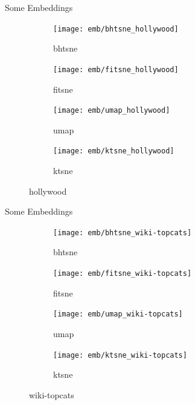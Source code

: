 \documentclass{beamer}
\begin{document}
\begin{frame}[fragile]{Some Embeddings}
    \vspace{-.5em}
    \begin{figure}[h]
        \centering
        \begin{subfigure}{0.3\textwidth}
            \texttt{[image: emb/bhtsne\_hollywood]}
            \caption{bhtsne}
            \vspace{-2em}
        \end{subfigure}
        \begin{subfigure}{0.3\textwidth}
            \texttt{[image: emb/fitsne\_hollywood]}
            \caption{fitsne}
            \vspace{-2em}
        \end{subfigure}
        \par\bigskip
        \begin{subfigure}{0.3\textwidth}
            \texttt{[image: emb/umap\_hollywood]}
            \caption{umap}
            \vspace{-1em}
        \end{subfigure}
        \begin{subfigure}{0.3\textwidth}
            \texttt{[image: emb/ktsne\_hollywood]}
            \caption{ktsne}
            \vspace{-1em}
        \end{subfigure}
        \caption{hollywood}
    \end{figure}
\end{frame}

\begin{frame}[fragile]{Some Embeddings}
    \vspace{-.5em}
    \begin{figure}[h]
        \centering
        \begin{subfigure}{0.3\textwidth}
            \texttt{[image: emb/bhtsne\_wiki-topcats]}
            \caption{bhtsne}
            \vspace{-2em}
        \end{subfigure}
        \begin{subfigure}{0.3\textwidth}
            \texttt{[image: emb/fitsne\_wiki-topcats]}
            \caption{fitsne}
            \vspace{-2em}
        \end{subfigure}
        \par\bigskip
        \begin{subfigure}{0.3\textwidth}
            \texttt{[image: emb/umap\_wiki-topcats]}
            \caption{umap}
            \vspace{-1em}
        \end{subfigure}
        \begin{subfigure}{0.3\textwidth}
            \texttt{[image: emb/ktsne\_wiki-topcats]}
            \caption{ktsne}
            \vspace{-1em}
        \end{subfigure}
        \caption{wiki-topcats}
    \end{figure}
\end{frame}
\end{document}
